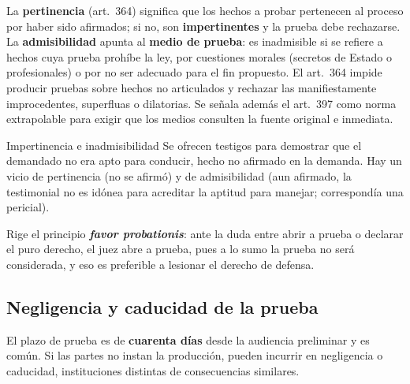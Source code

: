 \documentclass[12pt,oneside]{book}
\begin{document}
La \textbf{pertinencia} (art.~364) significa que los hechos a probar pertenecen al proceso por haber sido afirmados; si no, son \textbf{impertinentes} y la prueba debe rechazarse. La \textbf{admisibilidad} apunta al \textbf{medio de prueba}: es inadmisible si se refiere a hechos cuya prueba prohíbe la ley, por cuestiones morales (secretos de Estado o profesionales) o por no ser adecuado para el fin propuesto. El art.~364 impide producir pruebas sobre hechos no articulados y rechazar las manifiestamente improcedentes, superfluas o dilatorias. Se señala además el art.~397 como norma extrapolable para exigir que los medios consulten la fuente original e inmediata. %

\begin{ejemplo}{Impertinencia e inadmisibilidad}
Se ofrecen testigos para demostrar que el demandado no era apto para conducir, hecho no afirmado en la demanda. Hay un vicio de pertinencia (no se afirmó) y de admisibilidad (aun afirmado, la testimonial no es idónea para acreditar la aptitud para manejar; correspondía una pericial).
\end{ejemplo}

Rige el principio \textbf{\textit{favor probationis}}: ante la duda entre abrir a prueba o declarar el puro derecho, el juez abre a prueba, pues a lo sumo la prueba no será considerada, y eso es preferible a lesionar el derecho de defensa.

\subsection{Negligencia y caducidad de la prueba}

El plazo de prueba es de \textbf{cuarenta días} desde la audiencia preliminar y es común. Si las partes no instan la producción, pueden incurrir en negligencia o caducidad, instituciones distintas de consecuencias similares.
\end{document}
